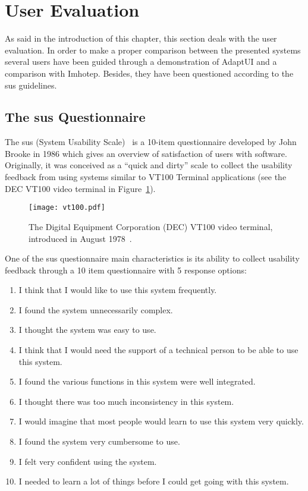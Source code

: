 \section{User Evaluation}
\label{sec:user_evaluation}

As said in the introduction of this chapter, this section deals with the user 
evaluation. In order to make a proper comparison between the presented systems 
several users have been guided through a demonstration of AdaptUI and a 
comparison with Imhotep. Besides, they have been questioned according to the 
\ac{sus} guidelines.

\subsection{The \ac{sus} Questionnaire}
\label{sec:sus}
The \ac{sus} (System Usability Scale)~\citep{sus} is a 10-item questionnaire 
developed by John Brooke in 1986 which gives an overview of satisfaction of 
users with software. Originally, it was conceived as a ``quick and dirty'' 
scale to collect the usability feedback from using systems similar to VT100 
Terminal applications (see the DEC VT100 video terminal in 
Figure~\ref{fig:vt100}).

\begin{figure}
\centering
\texttt{[image: vt100.pdf]}
\caption{The Digital Equipment Corporation (DEC) VT100 video terminal, 
introduced in August 1978~\citep{vt100}.}
\label{fig:vt100}
\end{figure}

One of the \ac{sus} questionnaire main characteristics is its ability to collect
usability feedback through a 10 item questionnaire with 5 response options: 

\begin{enumerate}
 \item I think that I would like to use this system frequently.
 \item I found the system unnecessarily complex.
 \item I thought the system was easy to use.
 \item I think that I would need the support of a technical person to be able to
 use this system.
 \item I found the various functions in this system were well integrated.
 \item I thought there was too much inconsistency in this system.
 \item I would imagine that most people would learn to use this system very
 quickly.
 \item I found the system very cumbersome to use.
 \item I felt very confident using the system.
 \item I needed to learn a lot of things before I could get going with this
 system.
\end{enumerate}

